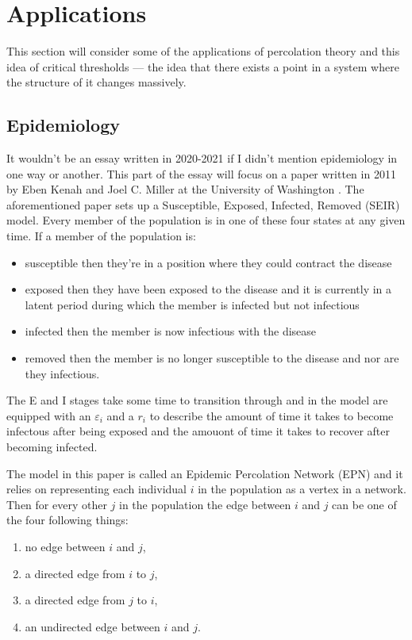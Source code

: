 \section{Applications}
This section will consider some of the applications of percolation theory and this idea of critical thresholds --- the idea that there exists a point in a system where the
structure of it changes massively.

\subsection{Epidemiology}
It wouldn't be an essay written in 2020-2021 if I didn't mention epidemiology in one way or another. This part of the essay will focus on a paper written in 2011 by Eben Kenah and
Joel C. Miller at the University of Washington \cite{Kenah}. The aforementioned paper sets up a Susceptible, Exposed, Infected, Removed (SEIR) model. Every member of the population
is in one of these four states at any given time. If a member of the population is:

\begin{itemize}
  \item susceptible then they're in a position where they could contract the disease
  \item exposed then they have been exposed to the disease and it is currently in a latent period during which the member is infected but not infectious
  \item infected then the member is now infectious with the disease
  \item removed then the member is no longer susceptible to the disease and nor are they infectious.
\end{itemize}

The E and I stages take some time to transition through and in the model are equipped with an $\varepsilon_i$ and a $r_i$ to describe the amount of time it takes to become infectous
after being exposed and the amouont of time it takes to recover after becoming infected. 

The model in this paper is called an Epidemic Percolation Network (EPN) and it relies on representing each individual $i$ in the population as a vertex in a
network. Then for every other $j$ in the population the edge between $i$ and $j$ can be one of the four following things:

\begin{enumerate}
  \item no edge between $i$ and $j$,
  \item a directed edge from $i$ to $j$,
  \item a directed edge from $j$ to $i$,
  \item an undirected edge between $i$ and $j$.
\end{enumerate}

